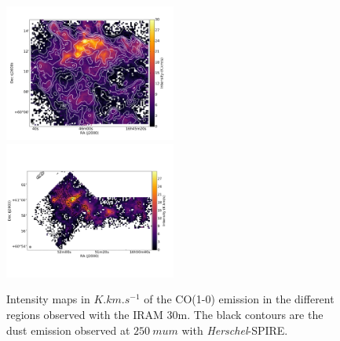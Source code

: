 \documentclass[traditabstract]{aa}
\begin{document}
\begin{figure}[h]
  \hspace{3mm}
  \includegraphics[page=6,height=4.5cm,trim=50 40 50 40,clip=true]{Figures/CO10_intensity.pdf} \\
  \includegraphics[height=4.5cm,trim=50 40 50 40,clip=true]{Figures/Draco2+9_rot_intensity.png}
  \caption{\label{Draco_CO10} Intensity maps in $K.km.s^{-1}$ of the CO(1-0) emission in the different regions observed with the IRAM 30m. The black contours are the dust emission observed at $250\: mu m$ with \emph{Herschel}-SPIRE.}
\end{figure}
\end{document}
